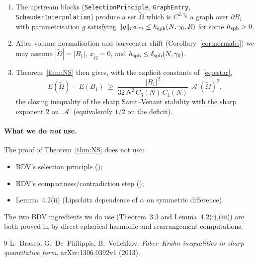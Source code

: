 \documentclass[11pt]{article}
\theoremstyle{definition}
\DeclareMathOperator{\Asym}{\mathcal{A}}
\newcommand{\bdy}{\partial}
\newcommand{\Ot}{\widetilde{\Omega}}
\begin{document}
\begin{enumerate}
\item[(R1)] The upstream blocks (\texttt{SelectionPrinciple},
\texttt{GraphEntry}, \texttt{SchauderInterpolation}) produce a set
$\Ot$ which is $C^{2,\gamma_0}$ a graph over $\bdy B_1$ with
parametrisation $g$ satisfying $\|g\|_{C^{2,\gamma_0}}\le
h_{\rm sph}(N,\gamma_0,R)$ for some $h_{\rm sph}>0$.

\item[(R2)] After volume normalisation and barycenter shift
(Corollary~\ref{cor:normabs}) we may assume $|\Ot|=|B_1|$,
$x_{\Ot}=0$, and $h_{\rm sph}\le\delta_{\rm sph}(N,\gamma_0)$.

\item[(R3)] Theorem~\ref{thm:NS} then gives, with the explicit constants
of~\eqref{eq:cstar},
\[
E(\Ot)-E(B_1)
\;\ge\;\frac{|B_1|^{2}}{32\,N^2\,C_3(N)\,C_1(N)}\,\Asym(\Ot)^{2},
\]
the closing inequality of the sharp Saint--Venant stability with the
sharp exponent $2$ on $\Asym$ (equivalently $1/2$ on the deficit).
\end{enumerate}

\paragraph{What we do \emph{not} use.}
The proof of Theorem~\ref{thm:NS} does not use:
\begin{itemize}
\item BDV's selection principle (\cite[Prop.~4.4]{BDV2013});
\item BDV's compactness/contradiction step (\cite[Thm~4.3]{BDV2013});
\item Lemma~4.2(ii) (Lipschitz dependence of $\alpha$ on symmetric
difference).
\end{itemize}
The two BDV ingredients we do use (Theorem~3.3 and Lemma~4.2(i),(iii))
are both proved in \cite{BDV2013} by direct spherical-harmonic and
rearrangement computations.

\begin{thebibliography}{9}
L.~Brasco, G.~De~Philippis, B.~Velichkov.
\emph{Faber--Krahn inequalities in sharp quantitative form}.
arXiv:1306.0392v1 (2013).
\end{thebibliography}
\end{document}
